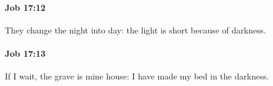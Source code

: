 		\paragraph{Job 17:12} %
			\label{JOB-17-12}

			They change the night into day: the light is short because of darkness.


		\paragraph{Job 17:13} %
			\label{JOB-17-13}

			If I wait, the grave is mine house: I have made my bed in the darkness.


